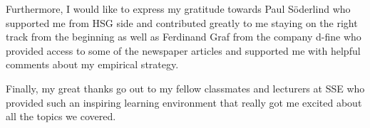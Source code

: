 Furthermore, I would like to express my gratitude towards Paul Söderlind who supported me from HSG side and contributed greatly to me staying on the right track from the beginning as well as Ferdinand Graf from the company d-fine who provided access to some of the newspaper articles and supported me with helpful comments about my empirical strategy.

Finally, my great thanks go out to my fellow classmates and lecturers at SSE who provided such an inspiring learning environment that really got me excited about all the topics we covered.
